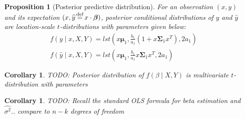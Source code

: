 \documentclass[10pt,fleqn]{amsart}
\newtheorem{proposition}[theorem]{Proposition}
\newtheorem{corollary}[theorem]{Corollary}
\theoremstyle{definition}
\theoremstyle{remark}
\numberwithin{equation}{section}
\newcommand{\eq}{\stackrel{\mathclap{\normalfont\text{def}}}{=}}
\newcommand{\bbeta}{\boldsymbol{\beta}}
\newcommand{\mmu}{\boldsymbol{\mu}}
\newcommand{\SSigma}{\boldsymbol{\Sigma}}
\newcommand{\yhat}{\widehat{y}}
\begin{document}
\begin{proposition}[Posterior predictive distribution]\label{posterior_var_pred}
    For an observation $(x, y)$ and its expectation $(x, \yhat\eq x\cdot\bbeta)$,
    posterior conditional distributions of $y$ and $\yhat$ are location-scale $t$-distributions with parameters given below:
    \begin{align}
        \label{posterior_var_y}&f(y\mid x, X, Y)=lst\left(x\mmu_1, \frac{b_1}{a_1}\left(1+x\SSigma_1 x^T\right), 2a_1\right)&&\\
        \label{posterior_var_y1}&f(\widehat y\mid x, X, Y)=lst\left(x\mmu_1, \frac{b_1}{a_1} x\SSigma_1 x^T, 2a_1\right)&&
    \end{align}
\end{proposition}
\begin{corollary}
    TODO: Posterior distribution of $f(\beta\mid X, Y)$ is multivariate $t$-distribution with parameters 
\end{corollary}
\begin{corollary}
    TODO: Recall the standard OLS formula for beta estimation and $\widehat{\sigma^2}$.. compare to $n-k$ degrees of freedom
\end{corollary}
\end{document}
